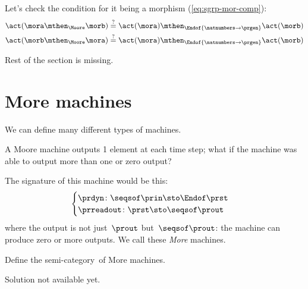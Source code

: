 Let's check the condition for it being a morphism (\cref{eq:sgrp-mor-comp}):
%
\begin{align}
    \act ( \mora \mthen_{\Moore} \morb) & \mathrel{\stackrel{?
    }{=} } \act ( \mora) \mthen_{\Endof  {\natnumbers \to \prgen}} \act(\morb) \label{eq:actions-on-sequences-left}                                                   \\
    \act ( \morb \mthen_{\Moore} \mora) & \mathrel{\stackrel{?}{=}}  \act ( \mora) \mthen_{\Endof  {\natnumbers \to \prgen}} \act(\morb) \label{eq:actions-on-sequences-right}
\end{align}
\begin{publictodo}
    Rest of the section is missing.
\end{publictodo}


\section{More machines}

We can define many different types of machines.

A Moore machine outputs 1 element at each time step; what if the machine was able to output more than one or zero output?

The signature of this machine would be this:
%
\begin{equation}
    \label{eq:more-signature}
    \begin{cases}
        \prdyn \colon \seqsof\prin \sto \Endof \prst \\
        \prreadout \colon \prst \sto \seqsof \prout
    \end{cases}
\end{equation}
%
where the output is not just~$\prout$ but~$\seqsof \prout$: the machine can produce zero or more outputs.
We call these \emph{More} machines.

\begin{exercise}
    Define the semi-category~\More of More machines.
\end{exercise}
\begin{solution}
    \begin{publictodo}
        Solution not available yet.
    \end{publictodo}
\end{solution}

